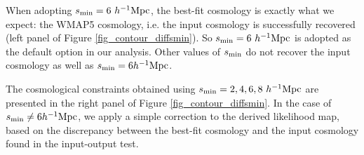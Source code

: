 \documentclass[iop]{emulateapj}
\begin{document}
When adopting $s_{\rm min}=6\ h^{-1}{\rm Mpc}$, the best-fit cosmology is exactly what we expect: the WMAP5 cosmology, 
i.e. the input cosmology is successfully recovered (left panel of Figure \ref{fig_contour_diffsmin}).
So $s_{\rm min}=6\ h^{-1}{\rm Mpc}$ is adopted as the default option in our analysis.
Other values of $s_{\rm min}$ do not recover the input cosmology as well as $s_{\rm min}=6h^{-1}{\rm Mpc}$.


The cosmological constraints obtained using $s_{\rm min}=2,4,6,8\ h^{-1} {\rm Mpc}$ 
are presented in the right panel of Figure \ref{fig_contour_diffsmin}.
In the case of $s_{\rm min}\neq6h^{-1} {\rm Mpc}$, we apply a simple correction to the derived likelihood map, 
based on the discrepancy between the best-fit cosmology and the input cosmology found in the input-output test.
\end{document}
